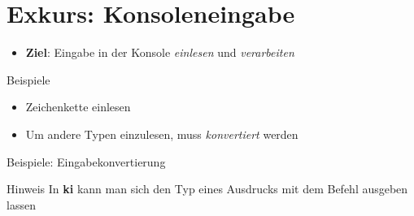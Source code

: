 \section{Exkurs: Konsoleneingabe}
\begin{frame}
    \slidehead

    \begin{itemize}
        \item \textbf{Ziel}: Eingabe in der Konsole \textit{einlesen} und \textit{verarbeiten}
    \end{itemize}

    \begin{block}{Beispiele}
        \begin{itemize}
            \item Zeichenkette einlesen
            \item Um andere Typen einzulesen, muss \textit{konvertiert} werden
        \end{itemize}
    \end{block}
\end{frame}

\begin{frame}
    \slidehead

    Beispiele: Eingabekonvertierung

    \begin{block}{Hinweis}
        In \textbf{ki} kann man sich den Typ eines Ausdrucks mit dem Befehl  ausgeben lassen
    \end{block}
\end{frame}

\livecoding



